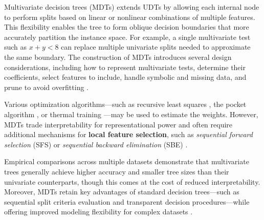 Multivariate decision trees (MDTs) extends UDTs by allowing each internal node to perform splits based on linear or nonlinear combinations of multiple features. This flexibility enables the tree to form oblique decision boundaries that more accurately partition the instance space. For example, a single multivariate test such as \(x + y < 8\) can replace multiple univariate splits needed to approximate the same boundary. The construction of MDTs introduces several design considerations, including how to represent multivariate tests, determine their coefficients, select features to include, handle symbolic and missing data, and prune to avoid overfitting \citep{brodley1995}.

Various optimization algorithms---such as recursive least squares \citep{young1984}, the pocket algorithm \citep{gallant1986}, or thermal training \citep{frean1990}---may be used to estimate the weights. However, MDTs trade interpretability for representational power and often require additional mechanisms for \textbf{local feature selection}, such as \emph{sequential forward selection} (SFS) or \emph{sequential backward elimination} (SBE) \citep{kittler1986}.

Empirical comparisons across multiple datasets demonstrate that multivariate trees generally achieve higher accuracy and smaller tree sizes than their univariate counterparts, though this comes at the cost of reduced interpretability. Moreover, MDTs retain key advantages of standard decision trees---such as sequential split criteria evaluation and transparent decision procedures---while offering improved modeling flexibility for complex datasets \citep{kozial2009, friedl1997, huan1998, canete}.



\address{%
Aneesh Agarwal\\
Monash University\\%
\\
%
%
%
\href{mailto:aaga0022@student.monash.edu}{\nolinkurl{aaga0022@student.monash.edu}}%
}

\address{%
Jack Jewson\\
Monash University\\%
Department of Econometrics and Business Statistics, Monash University, Australia\\
%
%
%
\href{mailto:Jack.Jewson@monash.edu}{\nolinkurl{Jack.Jewson@monash.edu}}%
}

\address{%
Erik Sverdrup\\
Monash University\\%
Department of Econometrics and Business Statistics, Monash University, Australia\\
%
%
%
\href{mailto:Erik.Sverdrup@monash.edu}{\nolinkurl{Erik.Sverdrup@monash.edu}}%
}
